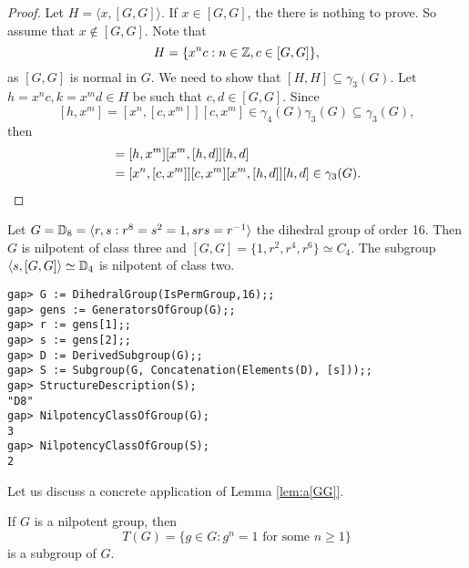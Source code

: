\begin{proof}
Let $H=\langle x,[G,G]\rangle$.  If $x\in [G,G]$, the there is nothing to prove. 
So assume that $x\not\in [G,G]$. Note that 
	\[
		H=\{x^nc:n\in\mathbb{Z},c\in [G,G]\},
	\]
as $[G,G]$ is normal in $G$. We need to show that
$[H,H]\subseteq\gamma_3(G)$. Let $h=x^nc,k=x^md\in H$
be such that $c,d\in [G,G]$. 
Since 
	\[
	[h,x^m]=[x^n,[c,x^m]][c,x^m]\in\gamma_4(G)\gamma_3(G)\subseteq\gamma_3(G),
	\]
then  
	\begin{align*}
		[h,k]&=[h,x^m][x^m,[h,d]][h,d]\\
			&=[x^n,[c,x^m]][c,x^m][x^m,[h,d]][h,d]\in\gamma_3(G).\qedhere
	\end{align*}
\end{proof}

\begin{example}
Let $G=\mathbb{D}_{8}=\langle r,s:r^{8}=s^2=1,srs=r^{-1}\rangle$ the dihedral group of order 16.
Then $G$ is nilpotent of class three and 
$[G,G]=\{1,r^2,r^4,r^6\}\simeq C_4$. The subgroup $\langle
s,[G,G]\rangle\simeq\mathbb{D}_4$ is nilpotent of class two. 
\begin{lstlisting}
gap> G := DihedralGroup(IsPermGroup,16);;
gap> gens := GeneratorsOfGroup(G);;
gap> r := gens[1];;
gap> s := gens[2];;
gap> D := DerivedSubgroup(G);;
gap> S := Subgroup(G, Concatenation(Elements(D), [s]));;
gap> StructureDescription(S);
"D8"
gap> NilpotencyClassOfGroup(G);
3
gap> NilpotencyClassOfGroup(S);
2
	\end{lstlisting}
\end{example}

Let us discuss a concrete application of Lemma \ref{lem:a[GG]}.

\begin{theorem}
\label{thm:T(nilpotent)}
If $G$ is a nilpotent group, then 
\[
T(G)=\{g\in G:g^n=1\text{ for some $n\geq1$}\}
\]
is a subgroup of $G$. 
\end{theorem}

